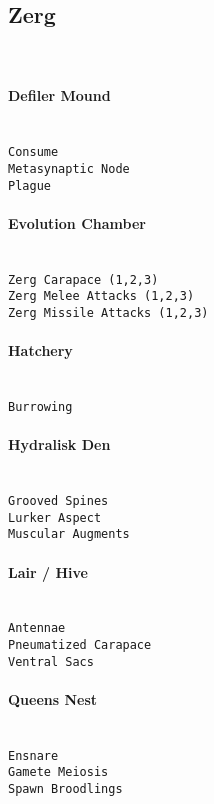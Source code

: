 \subsection{Zerg} \mbox{}\\

\paragraph{Defiler Mound} \mbox{}\\
\verb|Consume|\\
\verb|Metasynaptic Node|\\
\verb|Plague|

\paragraph{Evolution Chamber} \mbox{}\\
\verb|Zerg Carapace (1,2,3)|\\
\verb|Zerg Melee Attacks (1,2,3)|\\
\verb|Zerg Missile Attacks (1,2,3)|

\paragraph{Hatchery} \mbox{}\\
\verb|Burrowing|

\paragraph{Hydralisk Den} \mbox{}\\
\verb|Grooved Spines|\\
\verb|Lurker Aspect|\\
\verb|Muscular Augments|

\paragraph{Lair / Hive} \mbox{}\\
\verb|Antennae|\\
\verb|Pneumatized Carapace|\\
\verb|Ventral Sacs|

\paragraph{Queens Nest} \mbox{}\\
\verb|Ensnare|\\
\verb|Gamete Meiosis|\\
\verb|Spawn Broodlings|

